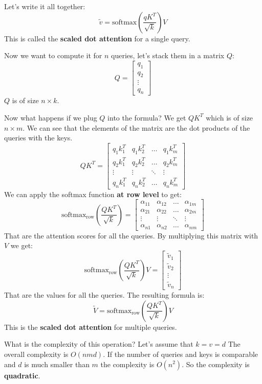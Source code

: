 Let's write it all together:
\[
    \tilde{v}=\text{softmax}\left(\frac{qK^T}{\sqrt{k}}\right)V
\]
This is called the \textbf{scaled dot attention} for a single query.

Now we want to compute it for $n$ queries, let's stack them in a matrix $Q$:
\[
    Q=\begin{bmatrix}
        q_1\\
        q_2\\
        \vdots\\
        q_n
    \end{bmatrix}
\]
$Q$ is of size $n\times k$.

Now what happens if we plug $Q$ into the formula?
We get $QK^T$ which is of size $n\times m$.
We can see that the elements of the matrix are the dot products of the queries with the keys.
\[
    QK^T=\begin{bmatrix}
        q_1k_1^T & q_1k_2^T & \ldots & q_1k_m^T\\
        q_2k_1^T & q_2k_2^T & \ldots & q_2k_m^T\\
        \vdots & \vdots & \ddots & \vdots\\
        q_nk_1^T & q_nk_2^T & \ldots & q_nk_m^T
    \end{bmatrix}
\]
We can apply the softmax function \textbf{at row level} to get:
\[
    \text{softmax}_\text{row}(\frac{QK^T}{\sqrt{k}})=\begin{bmatrix}
        \alpha_{11} & \alpha_{12} & \ldots & \alpha_{1m}\\
        \alpha_{21} & \alpha_{22} & \ldots & \alpha_{2m}\\
        \vdots & \vdots & \ddots & \vdots\\
        \alpha_{n1} & \alpha_{n2} & \ldots & \alpha_{nm}
    \end{bmatrix}
\]
That are the attention scores for all the queries.
By multiplying this matrix with $V$ we get:
\[
    \text{softmax}_\text{row}(\frac{QK^T}{\sqrt{k}})V=\begin{bmatrix}
        \tilde{v}_1\\
        \tilde{v}_2\\
        \vdots\\
        \tilde{v}_n
    \end{bmatrix}
\]
That are the values for all the queries.
The resulting formula is:
\[
    \tilde{V}=\text{softmax}_\text{row}\left(\frac{QK^T}{\sqrt{k}}\right)V
\]
This is the \textbf{scaled dot attention} for multiple queries.

What is the complexity of this operation?
Let's assume that $k=v=d$
The overall complexity is $O(nmd)$.
If the number of queries and keys is comparable and $d$ is much smaller than $m$
the complexity is $O(n^2)$. So the complexity is \textbf{quadratic}.
